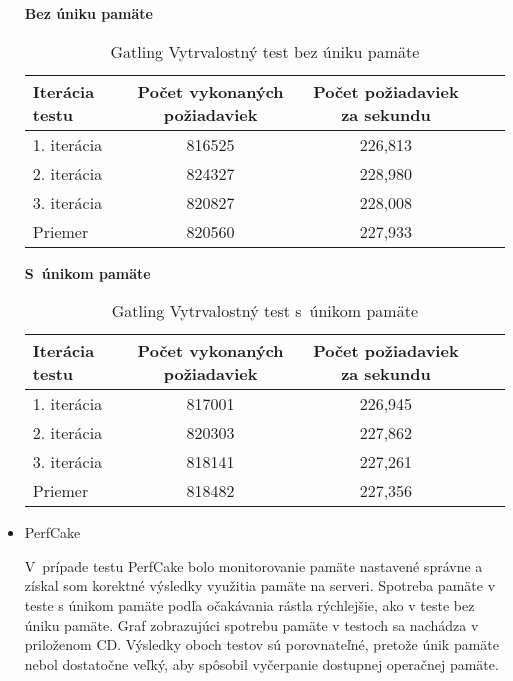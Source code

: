 \documentclass[12pt,oneside,final]{fithesis-utf8}
\begin{document}
\begin{itemize}
\textbf{Bez úniku pamäte}

\begin{table}[H]
\begin{center}
\begin{tabular}{ | l | c | c | c | c |}
		\hline
		 \textbf{Iterácia testu} & \textbf{Počet vykonaných požiadaviek} & \textbf{Počet požiadaviek za sekundu} \\ \hline
		 1. iterácia & 816525 & 226,813 \\ \hline
		 2. iterácia & 824327 & 228,980 \\ \hline
		 3. iterácia & 820827 & 228,008 \\ \hline
		 Priemer & 820560 & 227,933 \\ \hline
		 
\end{tabular}
\end{center}
\caption{Gatling Vytrvalostný test bez úniku pamäte}
\end{table}

\textbf{S~únikom pamäte}

\begin{table}[H]
\begin{center}
\begin{tabular}{ | l | c | c | c | c |}
		\hline
		 \textbf{Iterácia testu} & \textbf{Počet vykonaných požiadaviek} & \textbf{Počet požiadaviek za sekundu} \\ \hline
		 1. iterácia & 817001 & 226,945 \\ \hline
		 2. iterácia & 820303 & 227,862 \\ \hline
		 3. iterácia & 818141 & 227,261 \\ \hline
		 Priemer & 818482 & 227,356 \\ \hline
		 
\end{tabular}
\end{center}
\caption{Gatling Vytrvalostný test s~únikom pamäte}
\end{table}

\item PerfCake

V~prípade testu PerfCake bolo monitorovanie pamäte nastavené správne a získal som korektné výsledky využitia pamäte na serveri. Spotreba pamäte v teste s únikom pamäte podľa očakávania rástla rýchlejšie, ako v teste bez úniku pamäte. Graf zobrazujúci spotrebu pamäte v testoch sa nachádza v priloženom CD. Výsledky oboch testov sú porovnateľné, pretože únik pamäte nebol dostatočne veľký, aby spôsobil vyčerpanie dostupnej operačnej pamäte.


\end{itemize}
\end{document}
